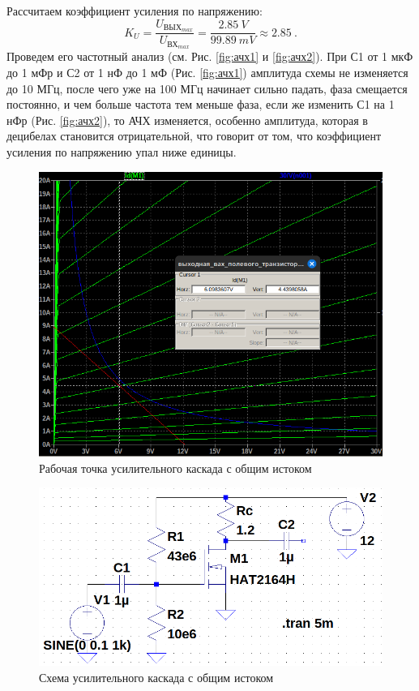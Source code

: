 Рассчитаем коэффициент усиления по напряжению:
\begin{equation*}
    K_U=\frac{U_{\text{ВЫХ}_{max}}}{U_{\text{ВХ}_{max}}}=\frac{2.85\ V}{99.89\ mV}
    \approx 2.85\ .
\end{equation*}
Проведем его частотный анализ (см. Рис. \ref{fig:ачх1} и \ref{fig:ачх2}). 
При С1 от 1 мкФ до 1 мФр и С2 от 1 нФ до 1 мФ (Рис. \ref{fig:ачх1}) амплитуда схемы не
изменяется до 10 МГц, после чего уже на 100 МГц начинает сильно падать, фаза
смещается постоянно, и чем больше частота тем меньше фаза, если же изменить 
С1 на 1 нФр (Рис. \ref{fig:ачх2}), то АЧХ изменяется, особенно амплитуда, которая
в децибелах становится отрицательной, что говорит от том, что коэффициент усиления
по напряжению упал ниже единицы.

\begin{figure}[H]
    \centering
    \includegraphics[width=0.8\linewidth]{figs/рабочая точка.png}
    \caption{Рабочая точка усилительного каскада с общим истоком}
    \label{fig:рабочая_точка}
\end{figure}

\begin{figure}[H]
    \centering
    \includegraphics[width=\linewidth]{figs/схема_общий_исток.png}
    \caption{Схема усилительного каскада с общим истоком}
    \label{fig:общий_исток}
\end{figure}

